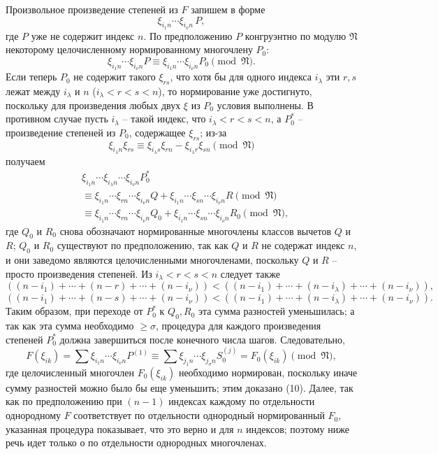 \documentclass[11pt]{article}
\providecommand{\frN}{\mathfrak N}
\begin{document}
Произвольное произведение степеней из \(F\) запишем в форме
\[
        \xi_{i_1n}\cdots\xi_{i_\nu n}\,P,
\]
где \(P\) уже не содержит индекс \(n\). По предположению \(P\) конгруэнтно по модулю \(\frN\) некоторому целочисленному нормированному многочлену \(P_0\):
\[
        \xi_{i_1n}\cdots\xi_{i_\nu n}P
        \equiv
        \xi_{i_1n}\cdots\xi_{i_\nu n}P_0
        \pmod{\frN}.
\]
Если теперь \(P_0\) не содержит такого \(\xi_{rs}\), что хотя бы для одного индекса \(i_\lambda\) эти \(r,s\) лежат между \(i_\lambda\) и \(n\) (\(i_\lambda<r<s<n\)), то нормирование уже достигнуто, поскольку для произведения любых двух \(\xi\) из \(P_0\) условия выполнены. В противном случае пусть \(i_\lambda\) -- такой индекс, что \(i_\lambda<r<s<n\), а \(P_0^*\) -- произведение степеней из \(P_0\), содержащее \(\xi_{rs}\); из-за
\[
        \xi_{i_\lambda n}\xi_{rs}\equiv
        \xi_{i_\lambda s}\xi_{rn}-\xi_{i_\lambda r}\xi_{sn}
        \pmod{\frN}
\]
получаем
\begin{align*}
 &\xi_{i_1n}\cdots\xi_{i_\lambda n}\cdots\xi_{i_\nu n}P_0^*\\
 &\equiv
 \xi_{i_1n}\cdots\xi_{rn}\cdots\xi_{i_\nu n}Q
 +
 \xi_{i_1n}\cdots\xi_{sn}\cdots\xi_{i_\nu n}R
 \pmod{\frN}\\
 &\equiv
 \xi_{i_1n}\cdots\xi_{rn}\cdots\xi_{i_\nu n}Q_0
 +
 \xi_{i_1n}\cdots\xi_{sn}\cdots\xi_{i_\nu n}R_0
 \pmod{\frN},
\end{align*}
где \(Q_0\) и \(R_0\) снова обозначают нормированные многочлены классов вычетов \(Q\) и \(R\); \(Q_0\) и \(R_0\) существуют по предположению, так как \(Q\) и \(R\) не содержат индекс \(n\), и они заведомо являются целочисленными многочленами, поскольку \(Q\) и \(R\) -- просто произведения степеней. Из \(i_\lambda<r<s<n\) следует также
\[
 ((n-i_1)+\cdots+(n-r)+\cdots+(n-i_\nu))
 <
 ((n-i_1)+\cdots+(n-i_\lambda)+\cdots+(n-i_\nu)),
\]
\[
 ((n-i_1)+\cdots+(n-s)+\cdots+(n-i_\nu))
 <
 ((n-i_1)+\cdots+(n-i_\lambda)+\cdots+(n-i_\nu)).
\]
Таким образом, при переходе от \(P_0^*\) к \(Q_0,R_0\) эта сумма разностей уменьшилась; а так как эта сумма необходимо \(\ge \sigma\), процедура для каждого произведения степеней \(P_0^*\) должна завершиться после конечного числа шагов. Следовательно,
\[
        F(\xi_{ik})
        =
        \sum \xi_{i_1n}\cdots\xi_{i_\nu n}P^{(1)}
        \equiv
        \sum \xi_{j_1n}\cdots\xi_{j_\sigma n}S_0^{(j)}
        =
        F_0(\xi_{ik})\pmod{\frN},
\]
где целочисленный многочлен \(F_0(\xi_{ik})\) необходимо нормирован, поскольку иначе сумму разностей можно было бы еще уменьшить; этим доказано (10). Далее, так как по предположению при \((n-1)\) индексах каждому по отдельности однородному \(F\) соответствует по отдельности однородный нормированный \(F_0\), указанная процедура показывает, что это верно и для \(n\) индексов; поэтому ниже речь идет только о по отдельности однородных многочленах.
\end{document}
